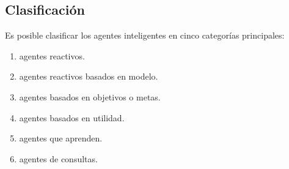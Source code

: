 \documentclass[a4paper,12pt,oneside]{book}
\begin{document}
\subsection{Clasificación}
Es posible clasificar los agentes inteligentes en cinco categorías principales:
\begin{enumerate} 
 \item agentes reactivos.
 \item agentes reactivos basados en modelo.
 \item agentes basados en objetivos o metas.
 \item agentes basados en utilidad.
 \item agentes que aprenden.
 \item agentes de consultas.
\end{enumerate}
\end{document}
